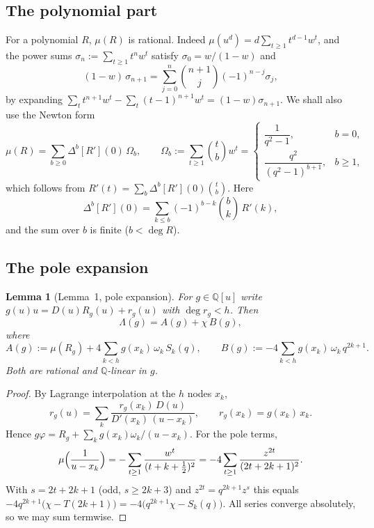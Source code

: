 \documentclass[11pt]{amsart}
\newtheorem{lemma}[theorem]{Lemma}
\theoremstyle{definition}
\theoremstyle{remark}
\numberwithin{equation}{section}
\newcommand{\QQ}{\mathbb{Q}}
\begin{document}
\subsection{The polynomial part}
For a polynomial $R$, $\mu(R)$ is rational. Indeed $\mu(u^d)=d\sum_{t\ge1}t^{d-1}w^t$, and the power sums
$\sigma_n:=\sum_{t\ge1}t^nw^t$ satisfy $\sigma_0=w/(1-w)$ and
\begin{equation}\label{eq:powsum}
  (1-w)\,\sigma_{n+1}=\sum_{j=0}^{n}\binom{n+1}{j}(-1)^{n-j}\sigma_j ,
\end{equation}
by expanding $\sum_t t^{n+1}w^t-\sum_t(t-1)^{n+1}w^{t}=(1-w)\sigma_{n+1}$. We shall also use the Newton form
\begin{equation}\label{eq:newton}
  \mu(R)=\sum_{b\ge0}\Delta^b[R'](0)\,\Omega_b,\qquad
  \Omega_b:=\sum_{t\ge1}\binom tbw^t=\begin{cases}\dfrac{1}{q^2-1},&b=0,\\[6pt] \dfrac{q^2}{(q^2-1)^{b+1}},&b\ge1,\end{cases}
\end{equation}
which follows from $R'(t)=\sum_b\Delta^b[R'](0)\binom tb$. Here
\[
  \Delta^b[R'](0)=\sum_{k\le b}(-1)^{b-k}\binom bk\,R'(k),
\]
and the sum over $b$ is finite ($b<\deg R$).

\subsection{The pole expansion}

\begin{lemma}[Lemma~1, pole expansion]\label{lem:pole}
For $g\in\QQ[u]$ write $g(u)u=D(u)R_g(u)+r_g(u)$ with $\deg r_g<h$. Then
\[
  \Lambda(g)=A(g)+\chi\,B(g),
\]
where
\[
  A(g):=\mu(R_g)+4\sum_{k<h}g(x_k)\,\omega_k\,S_k(q),\qquad
  B(g):=-4\sum_{k<h}g(x_k)\,\omega_k\,q^{2k+1}.
\]
Both are rational and $\QQ$-linear in $g$.
\end{lemma}

\begin{proof}
By Lagrange interpolation at the $h$ nodes $x_k$,
\[
  r_g(u)=\sum_k\frac{r_g(x_k)\,D(u)}{D'(x_k)\,(u-x_k)},\qquad r_g(x_k)=g(x_k)\,x_k .
\]
Hence $g\varphi=R_g+\sum_kg(x_k)\omega_k/(u-x_k)$. For the pole terms,
\[
  \mu\Bigl(\frac1{u-x_k}\Bigr)=-\sum_{t\ge1}\frac{w^t}{(t+k+\frac12)^2}=-4\sum_{t\ge1}\frac{z^{2t}}{(2t+2k+1)^2}.
\]
With $s=2t+2k+1$ (odd, $s\ge2k+3$) and $z^{2t}=q^{2k+1}z^s$ this equals
$-4q^{2k+1}\bigl(\chi-T(2k+1)\bigr)=-4\bigl(q^{2k+1}\chi-S_k(q)\bigr)$. All series converge absolutely, so we may
sum termwise.
\end{proof}
\end{document}
